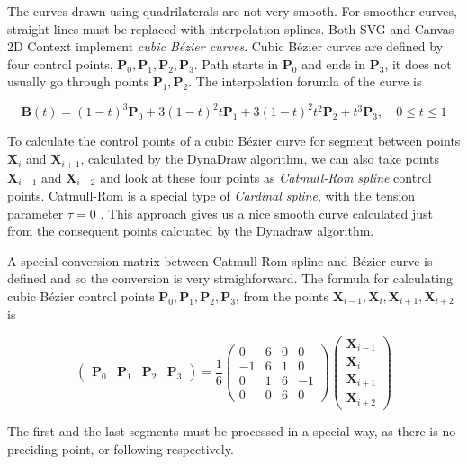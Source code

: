 The curves drawn using quadrilaterals are not very smooth. For smoother curves, straight lines must be replaced with interpolation splines. Both SVG and Canvas 2D Context implement \textit{cubic Bézier curves}. Cubic Bézier curves are defined by four control points, $ \mathbf{P}_0, \mathbf{P}_1, \mathbf{P}_2, \mathbf{P}_3 $. Path starts in $ \mathbf{P}_0 $ and ends in $ \mathbf{P}_3 $, it does not usually go through points $ \mathbf{P}_1, \mathbf{P}_2 $. The interpolation forumla of the curve \cite{bezier} is

$$ \mathbf{B}(t) = (1 - t)^3 \mathbf{P}_0 + 3(1-t)^{2}t\mathbf{P}_1 + 3(1-t)^{2}t^2\mathbf{P}_2 + t^3\mathbf{P}_3,\quad 0 \leq t \leq 1$$ 

To calculate the control points of a cubic Bézier curve for segment between points $\mathbf{X}_i$ and $\mathbf{X}_{i+1}$, calculated by the DynaDraw algorithm, we can also take points $\mathbf{X}_{i-1}$ and $\mathbf{X}_{i+2}$ and look at these four points as \textit{Catmull-Rom spline} control points. Catmull-Rom is a special type of \textit{Cardinal spline}, with the tension parameter $\tau = 0$ \cite{catmull_rom}. This approach gives us a nice smooth curve calculated just from the consequent points calcuated by the Dynadraw algorithm.

A special conversion matrix between Catmull-Rom spline and Bézier curve is defined \cite{catmull_bezier} and so the conversion is very straighforward. The formula for calculating cubic Bézier control points $ \mathbf{P}_0, \mathbf{P}_1, \mathbf{P}_2, \mathbf{P}_3 $, from the points $ \mathbf{X}_{i-1}, \mathbf{X}_i, \mathbf{X}_{i+1}, \mathbf{X}_{i+2} $ is

$$
\begin{pmatrix}\mathbf{P}_0 & \mathbf{P}_1 & \mathbf{P}_{2} & \mathbf{P}_{3} \end{pmatrix} = \frac{1}{6}\begin{pmatrix} 0 & 6 & 0 & 0 \\ -1 & 6 & 1 & 0 \\ 0 & 1 & 6 & -1 \\ 0 & 0 & 6 & 0 \end{pmatrix} \begin{pmatrix} \mathbf{X}_{i-1} \\ \mathbf{X}_i \\ \mathbf{X}_{i+1} \\ \mathbf{X}_{i+2} \end{pmatrix}
$$

The first and the last segments must be processed in a special way, as there is no preciding point, or following respectively. 


